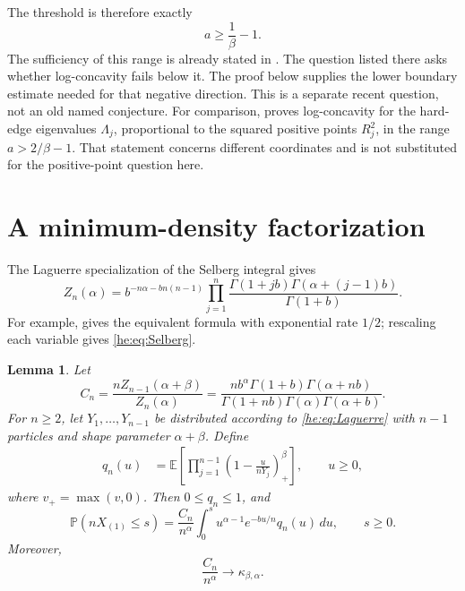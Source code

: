 \documentclass[11pt,a4paper]{article}
\newtheorem{lemma}[theorem]{Lemma}
\theoremstyle{definition}
\theoremstyle{remark}
\newcommand{\PP}{\mathbb P}
\newcommand{\EE}{\mathbb E}
\begin{document}
The threshold is therefore exactly
\[
 a\geq\frac1\beta-1.
\]
The sufficiency of this range is already stated in
\cite[Proposition~2.9, as described on the release page]{heEP}.
The question listed there asks whether log-concavity fails below it.
The proof below supplies the lower boundary estimate needed for that
negative direction. This is a separate recent question, not an old
named conjecture. For comparison, \cite[Section~3.1]{heBKM} proves
log-concavity for the hard-edge eigenvalues $\Lambda_j$, proportional
to the squared positive points $R_j^2$, in the
range $a>2/\beta-1$. That statement concerns different coordinates
and is not substituted for the positive-point question here.

\section{A minimum-density factorization}

The Laguerre specialization of the Selberg integral gives
\begin{equation}\label{he:eq:Selberg}
 Z_n(\alpha)
 =b^{-n\alpha-bn(n-1)}
 \prod_{j=1}^n
 \frac{\Gamma(1+jb)\Gamma(\alpha+(j-1)b)}{\Gamma(1+b)}.
\end{equation}
For example, \cite[(1.5)]{heJeong} gives the equivalent formula with
exponential rate $1/2$; rescaling each variable gives
\eqref{he:eq:Selberg}.

\begin{lemma}\label{he:lem:factorization}
Let
\[
 C_n=\frac{nZ_{n-1}(\alpha+\beta)}{Z_n(\alpha)}
 =\frac{n b^\alpha\Gamma(1+b)\Gamma(\alpha+nb)}
 {\Gamma(1+nb)\Gamma(\alpha)\Gamma(\alpha+b)}.
\]
For $n\geq2$, let $Y_1,\ldots,Y_{n-1}$ be distributed according to
\eqref{he:eq:Laguerre} with $n-1$ particles and shape parameter
$\alpha+\beta$.  Define
\begin{align}
 q_n(u)
 &=\EE\left[
  \prod_{j=1}^{n-1}\left(1-\frac{u}{nY_j}\right)_+^\beta
 \right],\qquad u\geq0,\label{he:eq:q}
\end{align}
where $v_+=\max(v,0)$.
Then $0\leq q_n\leq1$, and
\begin{equation}\label{he:eq:CDFn}
 \PP(nX_{(1)}\leq s)
 =\frac{C_n}{n^\alpha}
 \int_0^s u^{\alpha-1}e^{-bu/n}q_n(u)\,du,
 \qquad s\geq0.
\end{equation}
Moreover,
\begin{equation}\label{he:eq:Cnlimit}
 \frac{C_n}{n^\alpha}\longrightarrow\kappa_{\beta,\alpha}.
\end{equation}
\end{lemma}
\end{document}
